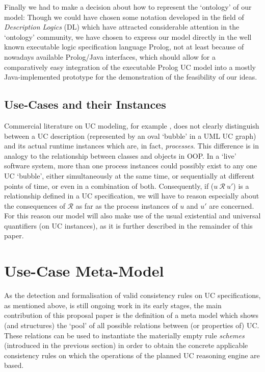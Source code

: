 Finally we had to make a decision about how to represent the `ontology' 
of our model: Though we could have chosen some notation developed in the 
field of \emph{Description Logics} (DL) which have attracted considerable 
attention in the `ontology' community, we have chosen to express our model 
directly in the well known executable logic specification language {\sc 
Prolog}, not at least because of nowadays available {\sc Prolog/Java} 
interfaces, which should allow for a comparatively easy integration of 
the executable {\sc Prolog} UC model into a mostly {\sc Java}-implemented 
prototype for the demonstration of the feasibility of our ideas.

\subsection{Use-Cases and their Instances}
Commercial literature on UC modeling, for example \cite{KGu04}, does 
not clearly distinguish between a UC description (represented by an 
oval `bubble' in a UML UC graph) and its actual runtime instances 
which are, in fact, \emph{processes}. This difference is in analogy 
to the relationship between classes and objects in OOP. In a `live' 
software system, more than one process instances could possibly exist 
to any one UC `bubble', either simultaneously at the same time, or 
sequentially at different points of time, or even in a combination 
of both. Consequently, if ($u~\mathcal{R}~u'$) is a relationship 
defined in a UC specification, we will have to reason especially 
about the consequences of $\mathcal{R}$ as far as the process 
instances of $u$ and $u'$ are concerned. For this reason our 
model will also make use of the usual existential and universal 
quantifiers (on UC instances), as it is further described in the 
remainder of this paper.

\section{Use-Case Meta-Model}
\label{sec:meta}
As the detection and formalisation of valid consistency rules on
UC specifications, as mentioned above, is still ongoing work in 
its early stages, the main contribution of this proposal paper
is the definition of a meta model which shows (and structures)
the `pool' of all possible relations between (or properties of)
UC. These relations can be used to instantiate the materially 
empty rule \emph{schemes} (introduced in the previous section) 
in order to obtain the concrete applicable consistency rules 
on which the operations of the planned UC reasoning engine 
are based.

